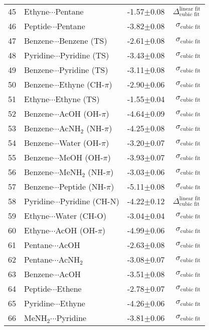 \begin{longtable}{llrr}
45 & Ethyne$\cdots$Pentane & -1.57$\pm$0.08 & $\Delta_\text{cubic fit}^\text{linear fit}$ \\
46 & Peptide$\cdots$Pentane & -3.82$\pm$0.08 & $\sigma_\text{cubic fit}$ \\
47 & Benzene$\cdots$Benzene (TS) & -2.61$\pm$0.08 & $\sigma_\text{cubic fit}$ \\
48 & Pyridine$\cdots$Pyridine (TS) & -3.43$\pm$0.08 & $\sigma_\text{cubic fit}$ \\
49 & Benzene$\cdots$Pyridine (TS) & -3.11$\pm$0.08 & $\sigma_\text{cubic fit}$ \\
50 & Benzene$\cdots$Ethyne (CH-$\pi$) & -2.90$\pm$0.06 & $\sigma_\text{cubic fit}$ \\
51 & Ethyne$\cdots$Ethyne (TS) & -1.55$\pm$0.04 & $\sigma_\text{cubic fit}$ \\
52 & Benzene$\cdots$AcOH (OH-$\pi$) & -4.64$\pm$0.09 & $\sigma_\text{cubic fit}$ \\
53 & Benzene$\cdots$AcNH$_2$ (NH-$\pi$) & -4.25$\pm$0.08 & $\sigma_\text{cubic fit}$ \\
54 & Benzene$\cdots$Water (OH-$\pi$) & -3.20$\pm$0.07 & $\sigma_\text{cubic fit}$ \\
55 & Benzene$\cdots$MeOH (OH-$\pi$) & -3.93$\pm$0.07 & $\sigma_\text{cubic fit}$ \\
56 & Benzene$\cdots$MeNH$_2$ (NH-$\pi$) & -3.03$\pm$0.06 & $\sigma_\text{cubic fit}$ \\
57 & Benzene$\cdots$Peptide (NH-$\pi$) & -5.11$\pm$0.08 & $\sigma_\text{cubic fit}$ \\
58 & Pyridine$\cdots$Pyridine (CH-N) & -4.22$\pm$0.12 & $\Delta_\text{cubic fit}^\text{linear fit}$ \\
59 & Ethyne$\cdots$Water (CH-O) & -3.04$\pm$0.04 & $\sigma_\text{cubic fit}$ \\
60 & Ethyne$\cdots$AcOH (OH-$\pi$) & -4.99$\pm$0.06 & $\sigma_\text{cubic fit}$ \\
61 & Pentane$\cdots$AcOH & -2.63$\pm$0.08 & $\sigma_\text{cubic fit}$ \\
62 & Pentane$\cdots$AcNH$_2$ & -3.08$\pm$0.07 & $\sigma_\text{cubic fit}$ \\
63 & Benzene$\cdots$AcOH & -3.51$\pm$0.08 & $\sigma_\text{cubic fit}$ \\
64 & Peptide$\cdots$Ethene & -2.78$\pm$0.07 & $\sigma_\text{cubic fit}$ \\
65 & Pyridine$\cdots$Ethyne & -4.26$\pm$0.06 & $\sigma_\text{cubic fit}$ \\
66 & MeNH$_2$$\cdots$Pyridine & -3.81$\pm$0.06 & $\sigma_\text{cubic fit}$ \\
\end{longtable}